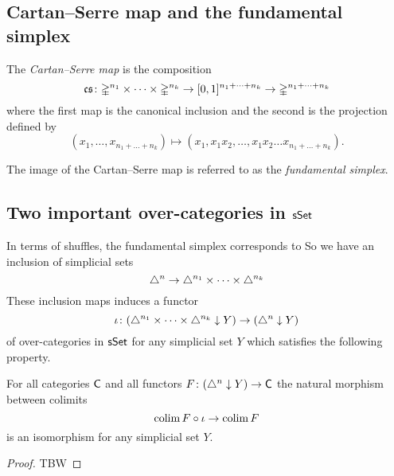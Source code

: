 \subsection{Cartan--Serre map and the fundamental simplex}

The \textit{Cartan--Serre map} is the composition
\[
\operatorname{\mathfrak{cs}} \colon
\mathbb{\Delta}^{n_1} \times \dots \times \mathbb{\Delta}^{n_k} \to
[0,1]^{n_1 + \dots + n_k} \to
\mathbb{\Delta}^{n_1 + \dots + n_k}
\]
where the first map is the canonical inclusion and the second is the projection defined by
\[
(x_1, \dots, x_{n_1 + \dots + n_k}) \mapsto (x_1, x_1x_2, \dots, x_1x_2 \dots x_{n_1 + \dots + n_k}).
\]


The image of the Cartan--Serre map is referred to as the \textit{fundamental simplex}. 

\subsection{Two important over-categories in $\mathsf{sSet}$}


In terms of shuffles, the fundamental simplex corresponds to 
So we have an inclusion of simplicial sets
\[
\triangle^n \to \triangle^{n_1} \times \dots \times \triangle^{n_k}
\]
These inclusion maps induces a functor
\[
\operatorname{\iota} \colon (\triangle^{n_1} \times \dots \times \triangle^{n_k} \downarrow Y) \to (\triangle^n \downarrow Y)
\]
of over-categories in $\mathsf{sSet}$ for any simplicial set $Y$ which satisfies the following property.

\begin{lemma} \label{l:final functor}
	For all categories $\mathsf{C}$ and all functors $F \colon (\triangle^n \downarrow Y) \to \mathsf{C}$ the natural morphism between colimits
	\[
	\operatorname*{colim} F \circ \operatorname{\iota} \to \operatorname*{colim} F
	\]
	is an isomorphism for any simplicial set $Y$.
\end{lemma}

\begin{proof}
	TBW
\end{proof}

